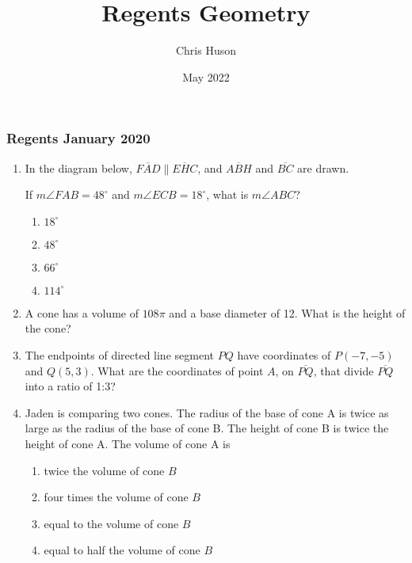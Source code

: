 \documentclass[12pt, oneside]{article}
\title{Regents Geometry}
\author{Chris Huson}
\date{May 2022}
\begin{document}
\subsubsection*{Regents January 2020}
\begin{enumerate}[itemsep=0.5cm]
\item In the diagram below, $\overline{FAD} \parallel \overline{EHC}$, and $\overline{ABH}$ and $\overline{BC}$ are drawn.
\begin{center}
  \end{center}
If $m\angle FAB = 48^\circ$ and $m\angle ECB = 18^\circ$, what is $m\angle ABC$?
\begin{multicols}{2}
  \begin{enumerate}
    \item $18^\circ$
    \item $48^\circ$
    \item $66^\circ$
    \item $114^\circ$
  \end{enumerate}
\end{multicols}

\item A cone has a volume of $108\pi$ and a base diameter of 12. What is the
height of the cone?

\item The endpoints of directed line segment $PQ$ have coordinates of
$P(-7,-5)$ and $Q(5,3)$. What are the coordinates of point $A$, on $\overline{PQ}$,
that divide $\overline{PQ}$ into a ratio of 1:3?

\item Jaden is comparing two cones. The radius of the base of cone A is
twice as large as the radius of the base of cone B. The height of cone
B is twice the height of cone A. The volume of cone A is
\begin{enumerate}
  \item twice the volume of cone $B$
  \item four times the volume of cone $B$
  \item equal to the volume of cone $B$
  \item equal to half the volume of cone $B$
\end{enumerate}


\end{enumerate}
\end{document}
